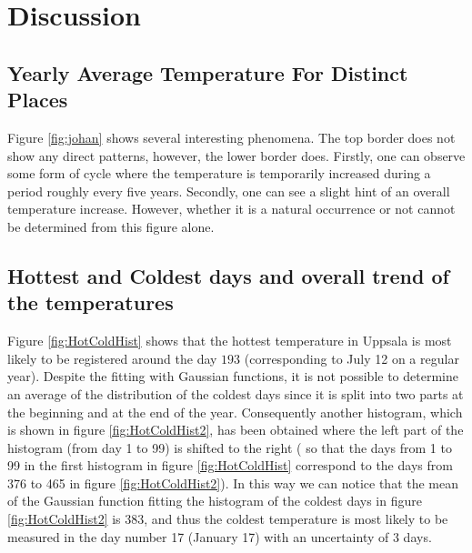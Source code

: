 \documentclass[a4paper]{article}
\begin{document}
\section{Discussion}\label{sec:Discussion}

\subsection{Yearly Average Temperature For Distinct Places}

Figure \ref{fig:johan} shows several interesting phenomena.
The top border does not show any direct patterns, however, the lower border does. Firstly, one can observe some form of cycle where the temperature is temporarily increased during a period roughly every five years. Secondly, one can see a slight hint of an overall temperature increase. However, whether it is a natural occurrence or not cannot be determined from this figure alone.

\subsection{Hottest and Coldest days and overall trend of the temperatures}
Figure \ref{fig:HotColdHist} shows that the hottest temperature in Uppsala is most likely to be registered around the day $193$ (corresponding to July 12 on a regular year). Despite the fitting with Gaussian functions, it is not possible to determine an average of the distribution of the coldest days since it is split into two parts at the beginning and at the end of the year. Consequently another histogram, which is shown in figure \ref{fig:HotColdHist2}, has been obtained where the left part of the histogram (from day 1 to 99) is shifted to the right ( so that the days from 1 to 99 in the first histogram in figure \ref{fig:HotColdHist} correspond to the days from 376 to 465 in figure \ref{fig:HotColdHist2}). In this way we can notice that the mean of the Gaussian function fitting the histogram of the coldest days in figure \ref{fig:HotColdHist2} is 383, and thus the coldest temperature is most likely to be measured in the day number 17 (January 17) with an uncertainty of 3 days.
\end{document}
